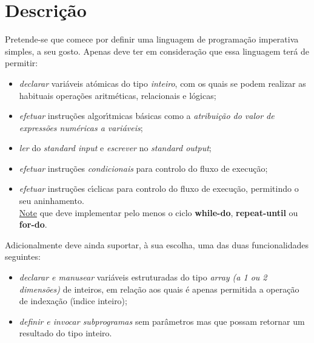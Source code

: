 \documentclass[11pt,a4paper]{report}%
\begin{document}
\section{Descrição} \label{sec:Descricao} %
Pretende-se que comece por definir uma linguagem de programação imperativa simples, a seu gosto.
Apenas deve ter em consideração que essa linguagem terá de permitir:
\begin{itemize}

\item \textit{declarar} variáveis atómicas do tipo \textit{inteiro}, com os quais se podem realizar as habituais operações aritméticas, relacionais e lógicas;

\item \textit{efetuar} instruções algorı́tmicas básicas como a \textit{atribuição do valor de expressões numéricas a variáveis};

\item \textit{ler} do \textit{standard input} e \textit{escrever} no \textit{standard output};

\item \textit{efetuar} instruções \textit{condicionais} para controlo do fluxo de execução;

\item \textit{efetuar} instruções cı́clicas para controlo do fluxo de execução, permitindo o seu aninhamento.\\
\underline{Note} que deve implementar pelo menos o ciclo \textbf{while-do}, \textbf{repeat-until} ou \textbf{for-do}.
\end{itemize}

Adicionalmente deve ainda suportar, à sua escolha, uma das duas funcionalidades seguintes:
\begin{itemize}
\item \textit{declarar e manusear} variáveis estruturadas do tipo \textit{array (a 1 ou 2 dimensões)} de inteiros, em relação aos quais é apenas permitida a operação de indexação (ı́ndice inteiro);
\item \textit{definir e invocar subprogramas} sem parâmetros mas que possam retornar um resultado do tipo inteiro.
\end{itemize}
\end{document}
